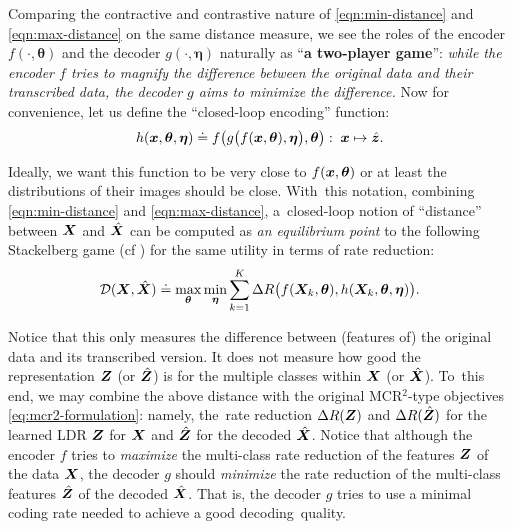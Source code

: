 \documentclass[../../book-main.tex]{subfiles}
\begin{document}
Comparing the contractive and contrastive nature of \eqref{eqn:min-distance} and \eqref{eqn:max-distance} on the same distance measure, we see the roles of the encoder $f(\cdot, \bm \theta)$ and the decoder $g(\cdot, \bm \eta)$ naturally as ``{\bf a  two-player game}'': {\em while the encoder $f$ tries to magnify the difference between the original data and their transcribed data, the decoder $g$ aims to minimize the difference.} Now for convenience, let us define the ``closed-loop encoding'' function:
\begin{equation}
    h(\bm{x}, \bm \theta,\bm \eta) \doteq f\big(g\big(f(\bm{x}, \bm \theta), \bm \eta\big), \bm \theta\big): \; \bm{x} \mapsto \hat {\bm{z}}.
\end{equation}

Ideally, we want this function to be very close to $f(\bm{x}, \bm \theta)$ or at least the distributions of their images should be close. With~this notation, combining \eqref{eqn:min-distance} and \eqref{eqn:max-distance}, a~closed-loop notion of ``distance'' between $\bm{X}$ and $\hat {\bm{X}}$ can be computed as {\em an equilibrium point} to the following Stackelberg game (cf ) for the same utility in terms of rate reduction:%
\begin{equation}
\mathcal{D}(\bm{X}, \hat {\bm{X}}) \doteq  \max_{\bm \theta} \min_{\bm \eta} \sum_{k=1}^K \Delta R\big(f(\bm{X}_k,\bm \theta), h(\bm{X}_k,\bm \theta,\bm \eta)\big).
    \label{eq:MCR2-GAN-pair}
\end{equation}

Notice that this only measures the difference between (features of) the original data and its transcribed version. It does not measure how good the representation $\bm{Z}$ (or $\hat {\bm{Z}}$) is for the multiple classes within $\bm{X}$ (or $\hat {\bm{X}}$). To~this end, we may combine the above distance with the original MCR$^2$-type objectives  \eqref{eq:mcr2-formulation}: namely, the~rate reduction $\Delta R(\bm{Z})$ and $\Delta R(\hat {\bm{Z}})$ for the learned LDR $\bm{Z}$ for $\bm{X}$ and $\hat {\bm{Z}}$ for the decoded $\hat {\bm{X}}$. Notice that although the encoder $f$ tries to {\em maximize} the multi-class rate reduction of the features $\bm{Z}$ of the data $\bm{X}$,  the decoder $g$ should {\em minimize} the rate reduction of the multi-class  features $\hat {\bm{Z}}$ of the decoded $\hat {\bm{X}}$. That is, the decoder $g$ tries to use a minimal  coding rate needed to achieve a good decoding~quality. 
\end{document}
